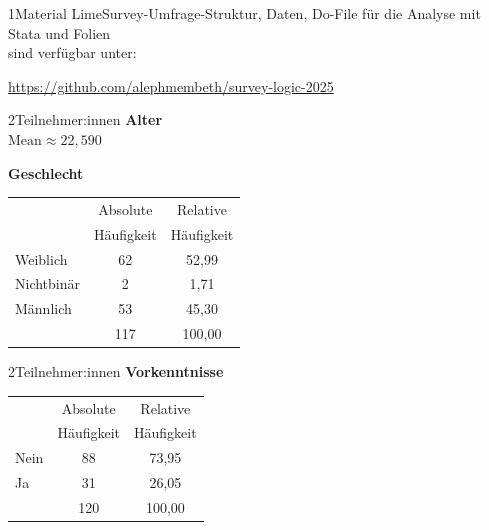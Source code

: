 \documentclass[xcolor=table,9pt,aspectratio=169]{beamer}
\begin{document}
\begin{frame}{\vspace*{10mm}1\hspace*{1em}Material}
LimeSurvey-Umfrage-Struktur, Daten, Do-File für die Analyse mit Stata und Folien\\sind verfügbar unter:

\bigskip
\url{https://github.com/alephmembeth/survey-logic-2025}
\end{frame}


\begin{frame}{\vspace*{10mm}2\hspace*{1em}Teilnehmer:innen}
\textbf{Alter}\\

\smallskip
$\text{Mean} \approx 22,590$

\bigskip
\textbf{Geschlecht}\\

\medskip
\begin{tabular}{lcc}
   \arrayrulecolor{blue2}\hline
                & Absolute     & Relative     \\
                & Häufigkeit   & Häufigkeit   \\
   \hline\hline
   Weiblich     &  62          &  52,99       \\
   Nichtbinär   &   2          &   1,71       \\
   Männlich     &  53          &  45,30       \\
   \hline
                & 117          & 100,00       \\
   \hline
\end{tabular}
\end{frame}


\begin{frame}{\vspace*{10mm}2\hspace*{1em}Teilnehmer:innen}
\textbf{Vorkenntnisse}\\

\medskip
\begin{tabular}{lcc}
   \arrayrulecolor{blue2}\hline
          & Absolute     & Relative     \\
          & Häufigkeit   & Häufigkeit   \\
   \hline\hline
   Nein   &  88          &  73,95       \\
   Ja     &  31          &  26,05       \\
   \hline
          & 120          & 100,00       \\
   \hline
\end{tabular}
\end{frame}
\end{document}
